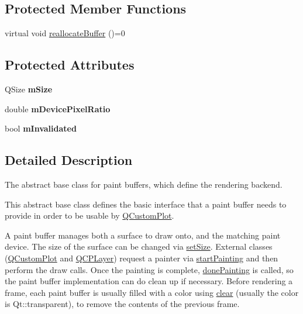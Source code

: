 \subsection*{Protected Member Functions}
\begin{DoxyCompactItemize}
\item 
virtual void \mbox{\hyperlink{class_q_c_p_abstract_paint_buffer_aee7506a52bd7e5a07c2af27935eb13e7}{reallocate\+Buffer}} ()=0
\end{DoxyCompactItemize}
\subsection*{Protected Attributes}
\begin{DoxyCompactItemize}
\item 
\mbox{\label{class_q_c_p_abstract_paint_buffer_ae246c426222bfa18d5e8797fab73e3ce}} 
Q\+Size {\bfseries m\+Size}
\item 
\mbox{\label{class_q_c_p_abstract_paint_buffer_a33c1fd784478441fcff9ebf3d69af5b2}} 
double {\bfseries m\+Device\+Pixel\+Ratio}
\item 
\mbox{\label{class_q_c_p_abstract_paint_buffer_a3bc49cc9cf9daaca3a60977f010c08c9}} 
bool {\bfseries m\+Invalidated}
\end{DoxyCompactItemize}


\subsection{Detailed Description}
The abstract base class for paint buffers, which define the rendering backend. 

This abstract base class defines the basic interface that a paint buffer needs to provide in order to be usable by \mbox{\hyperlink{class_q_custom_plot}{Q\+Custom\+Plot}}.

A paint buffer manages both a surface to draw onto, and the matching paint device. The size of the surface can be changed via \mbox{\hyperlink{class_q_c_p_abstract_paint_buffer_a8b68c3cd36533f1a4a23b5ce8cd66f01}{set\+Size}}. External classes (\mbox{\hyperlink{class_q_custom_plot}{Q\+Custom\+Plot}} and \mbox{\hyperlink{class_q_c_p_layer}{Q\+C\+P\+Layer}}) request a painter via \mbox{\hyperlink{class_q_c_p_abstract_paint_buffer_a9e9f29b19c033cf02fb96f1a148463f3}{start\+Painting}} and then perform the draw calls. Once the painting is complete, \mbox{\hyperlink{class_q_c_p_abstract_paint_buffer_a41b0dc6e7744f19fae09f8532c207dc1}{done\+Painting}} is called, so the paint buffer implementation can do clean up if necessary. Before rendering a frame, each paint buffer is usually filled with a color using \mbox{\hyperlink{class_q_c_p_abstract_paint_buffer_a9e253f4541dfc01992b77e8830bd7722}{clear}} (usually the color is {\ttfamily Qt\+::transparent}), to remove the contents of the previous frame.

